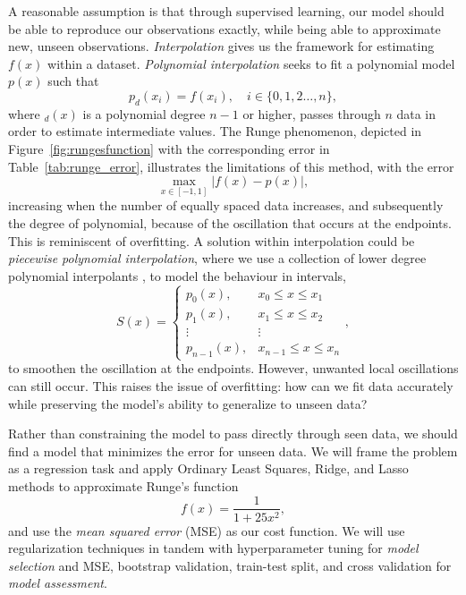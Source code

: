 \documentclass[amssymb,twocolumn,aps]{revtex4}
\begin{document}
A reasonable assumption is that through supervised learning, our model should be able to reproduce our observations exactly, while being able to approximate new, unseen observations. \textit{Interpolation} gives us the framework for estimating $f(x)$ within a dataset. \textit{Polynomial interpolation} seeks to fit a polynomial model $p(x)$ such that $$p_d(x_i) = f(x_i),\quad i\in \{0,1, 2\dots,  n\},$$ where $_d(x)$ is a polynomial degree $n-1$ or higher, passes through $n$ data in order to estimate intermediate values\cite{johau1}. The Runge phenomenon, depicted in Figure~\ref{fig:rungesfunction} with the corresponding error in Table~\ref{tab:runge_error}, illustrates the limitations of this method, with the error $$\max_{x \in [-1,1]} \lvert f(x) - p(x) \rvert, $$ increasing when the number of equally spaced data increases, and subsequently the degree of polynomial, because of the oscillation that occurs at the endpoints. This is reminiscent of overfitting. A solution within interpolation could be \textit{piecewise polynomial interpolation}, where we use a collection of lower degree polynomial interpolants \cite{johau2}, to model the behaviour in intervals,
\begin{equation*}
    S(x)=
    \begin{cases}
        p_0(x),     & x_0 \le x \le x_1     \\
        p_1(x),     & x_1 \le x \le x_2     \\
        \vdots      & \vdots                \\
        p_{n-1}(x), & x_{n-1} \le x \le x_n
    \end{cases},
\end{equation*}
to smoothen the oscillation at the endpoints. However, unwanted local oscillations can still occur. This raises the issue of overfitting: how can we fit data accurately while preserving the model’s ability to generalize to unseen data?

Rather than constraining the model to pass directly through seen data, we should find a model that minimizes the error for unseen data. We will frame the problem as a regression task and apply Ordinary Least Squares, Ridge, and Lasso methods to approximate Runge's function $$ f(x) = \frac{1}{1+25x^2},$$ and use the \textit{mean squared error} (MSE) as our cost function. We will use regularization techniques in tandem with hyperparameter tuning for \textit{model selection} and MSE, bootstrap validation, train-test split, and cross validation for \textit{model assessment}\cite{fysml1}.
\end{document}
